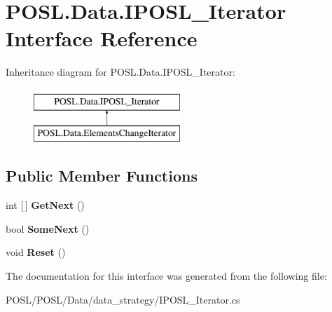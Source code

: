 \hypertarget{interfacePOSL_1_1Data_1_1IPOSL__Iterator}{}\section{P\+O\+S\+L.\+Data.\+I\+P\+O\+S\+L\+\_\+\+Iterator Interface Reference}
\label{interfacePOSL_1_1Data_1_1IPOSL__Iterator}
Inheritance diagram for P\+O\+S\+L.\+Data.\+I\+P\+O\+S\+L\+\_\+\+Iterator\+:\begin{figure}[H]
\begin{center}
\leavevmode
\includegraphics[height=2.000000cm]{interfacePOSL_1_1Data_1_1IPOSL__Iterator}
\end{center}
\end{figure}
\subsection*{Public Member Functions}
\begin{DoxyCompactItemize}
\item 
\mbox{\label{interfacePOSL_1_1Data_1_1IPOSL__Iterator_a2855c33c0c7e4e8d684ea718bf19d311}} 
int \mbox{[}$\,$\mbox{]} {\bfseries Get\+Next} ()
\item 
\mbox{\label{interfacePOSL_1_1Data_1_1IPOSL__Iterator_a4df9c770cb1739c35d1f8137feb8d9fc}} 
bool {\bfseries Some\+Next} ()
\item 
\mbox{\label{interfacePOSL_1_1Data_1_1IPOSL__Iterator_a1889fdd7b9b6b8f7029ada504a6b1c15}} 
void {\bfseries Reset} ()
\end{DoxyCompactItemize}


The documentation for this interface was generated from the following file\+:\begin{DoxyCompactItemize}
\item 
P\+O\+S\+L/\+P\+O\+S\+L/\+Data/data\+\_\+strategy/I\+P\+O\+S\+L\+\_\+\+Iterator.\+cs\end{DoxyCompactItemize}
